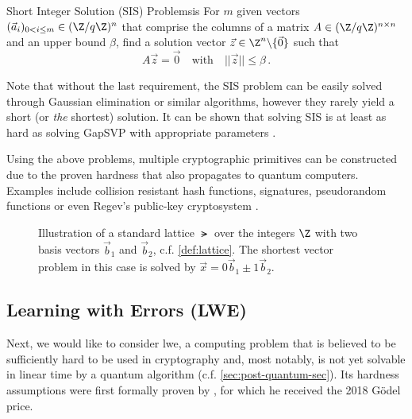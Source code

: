 \begin{definition}{Short Integer Solution (SIS) Problem}{sis}
  For $m$ given vectors $(\vec{a}_i)_{0 < i \leq m} \in (\Z / q\Z)^n$ that comprise the columns of a matrix
  $A \in (\Z / q\Z)^{n \times n}$ and an upper bound $\beta$, find
  a solution vector $\vec{z} \in \Z^n \backslash \{\vec{0}\}$ such that
  $$A \vec{z} = \vec{0} \quad \mathrm{with} \quad ||\vec{z}|| \leq \beta\,.$$
\end{definition}

Note that without the last requirement, the SIS problem can be easily solved through Gaussian elimination or similar algorithms, however they rarely yield a short (or \textit{the} shortest) solution.
It can be shown that solving SIS is at least as hard as solving GapSVP with appropriate parameters \parencite{1996-hard-lattice-problems}.

Using the above problems, multiple cryptographic primitives can be constructed due to the proven hardness that also propagates to quantum computers.
Examples include collision resistant hash functions, signatures, pseudorandom functions or even Regev's public-key cryptosystem \parencite{2016-decade-of-lattice}.

\begin{figure}
  \centering
  \caption{Illustration of a standard lattice $\lat$ over the integers $\Z$
    with two basis vectors $\vec{b}_1$ and $\vec{b}_2$, c.f. \autoref{def:lattice}.
    The shortest vector problem in this case is solved by $\vec{x} = 0 \vec{b}_1 \pm 1 \vec{b}_2$.}
  \label{fig:lattice}
\end{figure}

\subsection{Learning with Errors (LWE)}
\label{subsec:lwe}
Next, we would like to consider \Gls{lwe}, a computing problem that is believed to be sufficiently hard to be used in cryptography and, most notably, is not yet solvable in linear time by a quantum algorithm (c.f. \autoref{sec:post-quantum-sec}).
Its hardness assumptions were first formally proven by \citeauthor{2005-lwe-original}, for which he received the 2018 Gödel price.

